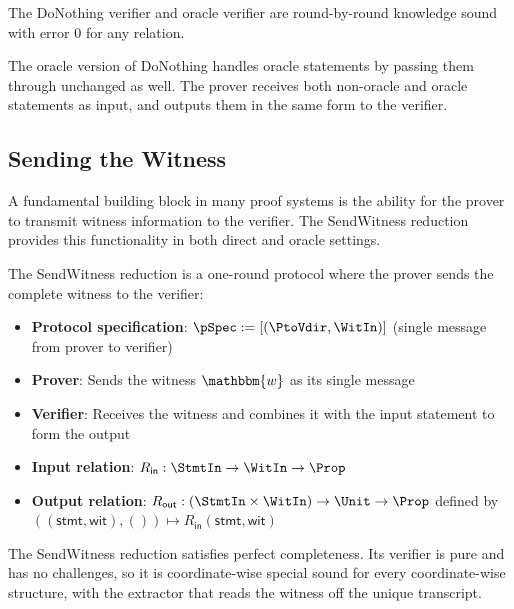 \begin{theorem}
    The DoNothing verifier and oracle verifier are round-by-round knowledge sound with error $0$ for any relation.
    \leanok
\end{theorem}

The oracle version of DoNothing handles oracle statements by passing them through unchanged as well. The prover receives both non-oracle and oracle statements as input, and outputs them in the same form to the verifier.

\subsection{Sending the Witness}

A fundamental building block in many proof systems is the ability for the prover to transmit witness information to the verifier. The SendWitness reduction provides this functionality in both direct and oracle settings.

\begin{definition}
    \label{def:sendwitness_reduction}
    The SendWitness reduction is a one-round protocol where the prover sends the complete witness to the verifier:
    \begin{itemize}
        \item \textbf{Protocol specification}: $\pSpec := [(\PtoVdir, \WitIn)]$ (single message from prover to verifier)
        \item \textbf{Prover}: Sends the witness $\mathbbm{w}$ as its single message
        \item \textbf{Verifier}: Receives the witness and combines it with the input statement to form the output
        \item \textbf{Input relation}: $R_{\mathsf{in}} : \StmtIn \to \WitIn \to \Prop$
        \item \textbf{Output relation}: $R_{\mathsf{out}} : (\StmtIn \times \WitIn) \to \Unit \to \Prop$ defined by $((\mathsf{stmt}, \mathsf{wit}), ()) \mapsto R_{\mathsf{in}}(\mathsf{stmt}, \mathsf{wit})$
    \end{itemize}
    \leanok
\end{definition}

\begin{theorem}
    The SendWitness reduction satisfies perfect completeness. Its verifier is pure and has no challenges, so it is coordinate-wise special sound for every coordinate-wise structure, with the extractor that reads the witness off the unique transcript.
    \leanok
\end{theorem}

